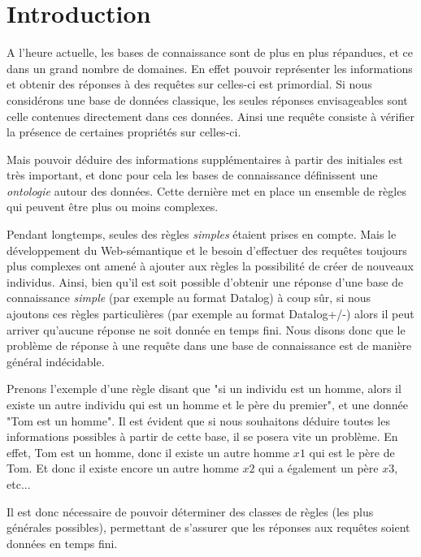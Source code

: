 
\section{Introduction}
A l'heure actuelle, les bases de connaissance sont de plus en plus répandues, et ce dans
un grand nombre de domaines.
En effet pouvoir représenter les informations et obtenir des réponses à des requêtes sur
celles-ci est primordial.
Si nous considérons une base de données classique, les seules réponses envisageables sont
celle contenues directement dans ces données.
Ainsi une requête consiste à vérifier la présence de certaines propriétés sur celles-ci.

Mais pouvoir déduire des informations supplémentaires à partir des initiales est très
important, et donc pour cela les bases de connaissance définissent une {\em ontologie}
autour des données.
Cette dernière met en place un ensemble de règles qui peuvent être plus ou moins
complexes.

Pendant longtemps, seules des règles {\em simples} étaient prises en compte. Mais le
développement du Web-sémantique et le besoin d'effectuer des requêtes toujours plus
complexes ont amené à ajouter aux règles la possibilité de créer de nouveaux individus.
Ainsi, bien qu'il est soit possible d'obtenir une réponse d'une base de connaissance {\em simple} (par exemple
au format Datalog) à coup sûr, si nous ajoutons ces règles particulières (par exemple au
format Datalog+/-) alors il peut
arriver qu'aucune réponse ne soit donnée en temps fini.
Nous disons donc que le problème de réponse à une requête dans une base de connaissance
est de manière général indécidable.

Prenons l'exemple d'une règle disant que "si un individu est un homme, alors il existe un
autre individu qui est un homme et le père du premier", et une donnée "Tom est un homme".
Il est évident que si nous souhaitons déduire toutes les informations possibles à partir
de cette base, il se posera vite un problème.
En effet, Tom est un homme, donc il existe un autre homme $x1$ qui est le père de Tom.
Et donc il existe encore un autre homme $x2$ qui a également un père $x3$, etc...

Il est donc nécessaire de pouvoir déterminer des classes de règles (les plus générales
possibles), permettant de s'assurer que les réponses aux requêtes soient données en temps
fini. 



